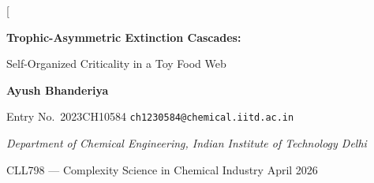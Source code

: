 \documentclass[10pt,a4paper,twocolumn]{article}
\begin{document}
\twocolumn[\begin{@twocolumnfalse}
\begin{minipage}{\textwidth}
\vspace*{-1.2em}
\noindent{\color{accent}\rule{\textwidth}{2.5pt}}
\par\vspace{2pt}
\noindent{\color{accent}\rule{\textwidth}{0.6pt}}
\par\vspace{14pt}
\begin{center}
{\sffamily\bfseries\fontsize{19}{23}\selectfont\color{accentdark}
Trophic-Asymmetric Extinction Cascades:\par
Self-Organized Criticality in a Toy Food Web\par}
\vspace{12pt}
{\sffamily\large\bfseries Ayush Bhanderiya}\par\vspace{3pt}
{\sffamily\small Entry No.\ 2023CH10584 \quad\textbullet\quad \texttt{ch1230584@chemical.iitd.ac.in}}\par\vspace{3pt}
{\sffamily\small\itshape Department of Chemical Engineering, Indian Institute of Technology Delhi}\par\vspace{5pt}
{\sffamily\small CLL798 --- Complexity Science in Chemical Industry \quad\textbullet\quad April 2026}
\end{center}
\vspace{5pt}
\noindent{\color{accent}\rule{\textwidth}{0.6pt}}
\par\vspace{2pt}
\noindent{\color{accent}\rule{\textwidth}{2.5pt}}
\par\vspace{16pt}
\end{minipage}
\noindent{}
\end{@twocolumnfalse}
\end{document}
